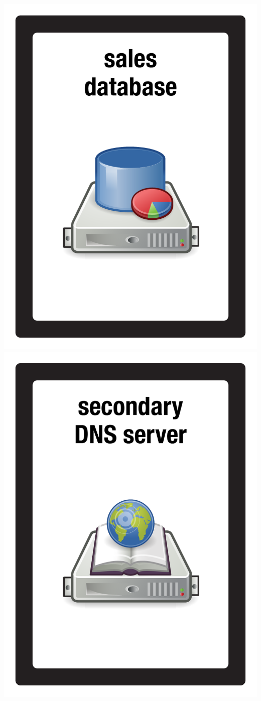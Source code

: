 \documentclass{letter}
\begin{document}
\includegraphics{patch/patch_sales_db}
\includegraphics{patch/patch_secondary_dns}
\end{document}

